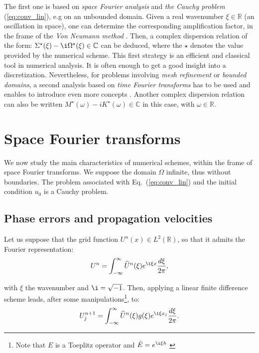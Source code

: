 \noindent The first one is based on \emph{space Fourier analysis} and \emph{the Cauchy problem} (\ref{eq:conv_lin}), e.g on an unbounded domain. Given a real wavenumber $\xi \in \mathbb{R}$ (an oscillation in space), one can determine the corresponding amplification factor, in the frame of the \emph{Von Neumann method} \cite{Hirsch:1988}. Then, a complex dispersion relation of the form: $\Sigma^{\star}(\xi) -\i \Omega^{\star}(\xi) \in \mathbb{C}$ can be deduced, where the $\star$ denotes the value provided by the numerical scheme. This first strategy is an efficient and classical tool in numerical analysis. It is often enough to get a good insight into a discretization. Nevertheless, for problems involving \emph{mesh refinement} or \emph{bounded domains}, a second analysis based on \emph{time Fourier transforms} has to be used and enables to introduce even more concepts \cite{Vichnevetsky:1982}. Another complex dispersion relation can also be written $M^{\star}(\omega) - i K^{\star}(\omega) \in \mathbb{C}$ in this case, with $\omega \in \mathbb{R}$.  




\section{Space Fourier transforms \label{sec:space}}
We now study the main characteristics of numerical schemes, within the frame of space Fourier transforms. We suppose the domain $\Omega$ infinite, thus without boundaries. The problem associated with Eq.~(\ref{eq:conv_lin}) and the initial condition $u_0$ is a Cauchy problem.

\subsection{Phase errors and propagation velocities}
\noindent Let us suppose that the grid function $U^n(x)\in L^2(\mathbb{R})$, so that it admits the Fourier representation:
$$  U^n = \int_{-\infty}^{\infty} \widehat{U}^n(\xi) e^{\i \xi x} \frac{d\xi}{2\pi}, $$

\noindent with $\xi$ the wavenumber and $\i = \sqrt{-1}$. Then, applying a linear finite difference scheme leads, after some manipulations\footnote{Note that $E$ is a Toeplitz operator and $\hat{E}=e^{\i \xi h}$ \cite{Vichnevetsky:1982}}, to:
$$ U^{n+1}_j = \int_{-\infty}^{\infty} \widehat{U}^n(\xi) g(\xi) e^{\i \xi x_j} \frac{d\xi}{2\pi} .$$

